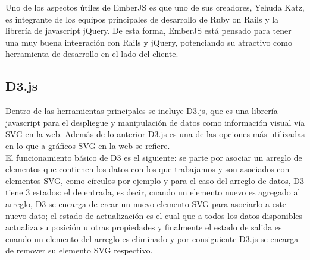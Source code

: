 Uno de los aspectos útiles de EmberJS es que uno de sus creadores, Yehuda Katz, es integrante de los equipos principales de desarrollo de Ruby on Rails y la librería de javascript jQuery. De esta forma, EmberJS está pensado para tener una muy buena integración con Rails y jQuery, potenciando su atractivo como herramienta de desarrollo en el lado del cliente.


\subsection{D3.js} %
\label{sub:d3_js}

Dentro de las herramientas principales se incluye D3.js\cite{d3}, que es una librería javascript para el despliegue y manipulación de datos como información visual vía SVG en la web. Además de lo anterior D3.js es una de las opciones más utilizadas en lo que a gráficos SVG en la web se refiere.\\

El funcionamiento básico de D3 es el siguiente: se parte por asociar un arreglo de elementos que contienen los datos con los que trabajamos y son asociados con elementos SVG, como círculos por ejemplo y para el caso del arreglo de datos, D3 tiene 3 estados: el de entrada, es decir, cuando un elemento nuevo es agregado al arreglo, D3 se encarga de crear un nuevo elemento SVG para asociarlo a este nuevo dato; el estado de actualización  es el cual que a todos los datos disponibles actualiza su posición u otras propiedades y finalmente el estado de salida es cuando un elemento del arreglo es eliminado y por consiguiente D3.js se encarga de remover su elemento SVG respectivo.


